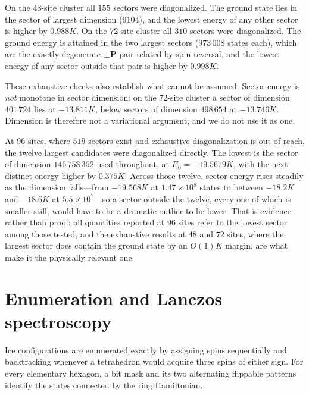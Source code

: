 \documentclass[
aps,
prl,
onecolumn,
amsmath,
amssymb,
superscriptaddress,
longbibliography
]{revtex4-2}
\begin{document}
On the 48-site cluster all $155$ sectors were diagonalized. The
ground state lies in the sector of largest dimension ($9104$), and the
lowest energy of any other sector is higher by $0.988K$. On the
72-site cluster all $310$ sectors were diagonalized. The ground
energy is attained in the two largest sectors ($973\,008$ states
each), which are the exactly degenerate $\pm\bm P$ pair related by
spin reversal, and the lowest energy of any sector outside that pair
is higher by $0.998K$.

These exhaustive checks also establish what cannot be assumed. Sector
energy is \emph{not} monotone in sector dimension: on the 72-site
cluster a sector of dimension $401\,724$ lies at $-13.811K$, below
sectors of dimension $498\,654$ at $-13.746K$. Dimension is therefore
not a variational argument, and we do not use it as one.

At 96 sites, where $519$ sectors exist and exhaustive diagonalization
is out of reach, the twelve largest candidates were diagonalized
directly. The lowest is the sector of dimension $146\,758\,352$ used
throughout, at $E_0=-19.5679K$, with the next distinct energy higher
by $0.375K$. Across those twelve, sector energy rises steadily as the
dimension falls---from $-19.568K$ at $1.47\times10^{8}$ states to
between $-18.2K$ and $-18.6K$ at $5.5\times10^{7}$---so a sector
outside the twelve, every one of which is smaller still, would have to
be a dramatic outlier to lie lower. That is evidence rather than
proof: all quantities reported at 96 sites refer to the lowest sector
among those tested, and the exhaustive results at 48 and 72 sites,
where the largest sector does contain the ground state by an $O(1)K$
margin, are what make it the physically relevant one.

\section{Enumeration and Lanczos spectroscopy}
\label{sec:methods}

Ice configurations are enumerated exactly by assigning spins
sequentially and backtracking whenever a tetrahedron would acquire
three spins of either sign.
For every elementary hexagon, a bit mask and its two alternating
flippable patterns identify the states connected by the ring
Hamiltonian.
\end{document}
